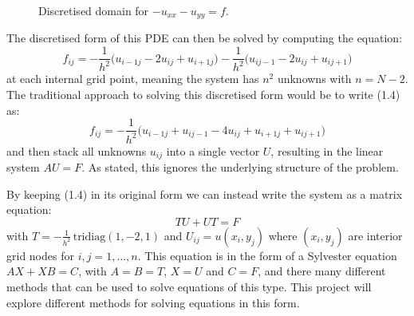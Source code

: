 \documentclass{article}
\numberwithin{equation}{section}
\begin{document}
\begin{figure}[H]
\centering
\caption{Discretised domain for $-u_{xx}-u_{yy}=f$.}
\end{figure}

The discretised form of this PDE can then be solved by computing the equation:
	\begin{equation}
	f_{ij} = -\frac{1}{h^2} \big( u_{i-1j} - 2u_{ij} + u_{i+1j} \big) - \frac{1}{h^2} \big( u_{ij-1} - 2u_{ij} + u_{ij+1} \big)
	\end{equation}
at each internal grid point, meaning the system has $n^2$ unknowns with $n=N-2$. The traditional approach to solving this discretised form would be to write (1.4) as:
	\begin{equation}
	f_{ij} = -\frac{1}{h^2} \big( u_{i-1j} + u_{ij-1} - 4u_{ij} + u_{i+1j} + u_{ij+1}  \big)
	\end{equation}
and then stack all unknowns $u_{ij}$ into a single vector $U$, resulting in the linear system $AU=F$. As stated, this ignores the underlying structure of the problem.

By keeping (1.4) in its original form we can instead write the system as a matrix equation:
	\begin{equation} 
	TU + UT = F
	\end{equation}
with $T=-\frac{1}{h^2} \, \text{tridiag}(1,-2,1)$ and $U_{ij} = u(x_i, y_j)$ where $(x_i, y_j)$ are interior grid nodes for $i,j=1,\dots,n$. This equation is in the form of a Sylvester equation $AX + XB = C$, with $A=B=T$, $X=U$ and $C=F$, and there many different methods that can be used to solve equations of this type. This project will explore different methods for solving equations in this form. 
\end{document}
